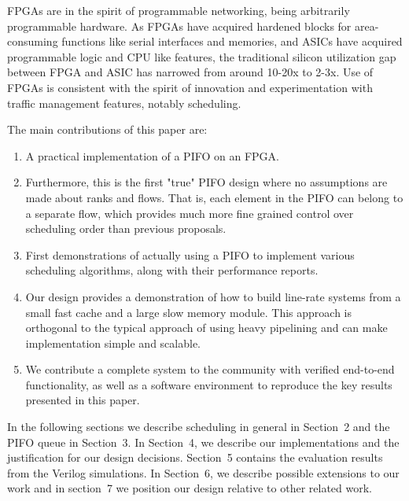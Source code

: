 FPGAs are in the spirit of programmable networking, being arbitrarily programmable hardware.  As FPGAs have acquired hardened blocks for area-consuming functions like serial interfaces and memories, and ASICs have acquired programmable logic and CPU like features, the traditional silicon utilization gap between FPGA and ASIC has narrowed from around 10-20x to 2-3x.  Use of FPGAs is consistent with the spirit of innovation and experimentation with traffic management features, notably scheduling.

The main contributions of this paper are:
\begin{enumerate}
\item A practical implementation of a PIFO on an FPGA.
\item Furthermore, this is the first "true" PIFO design where no assumptions are made about ranks and flows. That is, each element in the PIFO can belong to a separate flow, which provides much more fine grained control over scheduling order than previous proposals.
\item First demonstrations of actually using a PIFO to implement various scheduling algorithms, along with their performance reports.
\item Our design provides a demonstration of how to build line-rate systems from a small fast cache and a large slow memory module. This approach is orthogonal to the typical approach of using heavy pipelining and can make implementation simple and scalable.
\item We contribute a complete system to the community with verified end-to-end functionality, as well as a software environment to reproduce the key results presented in this paper.
\end{enumerate}

In the following sections we describe scheduling in general in Section~2 and the PIFO queue in Section~3.  In Section~4, we describe our implementations and the justification for our design decisions.  Section~5 contains the evaluation results from the Verilog simulations. In Section~6, we describe possible extensions to our work and in section~7 we position our design relative to other related work.

